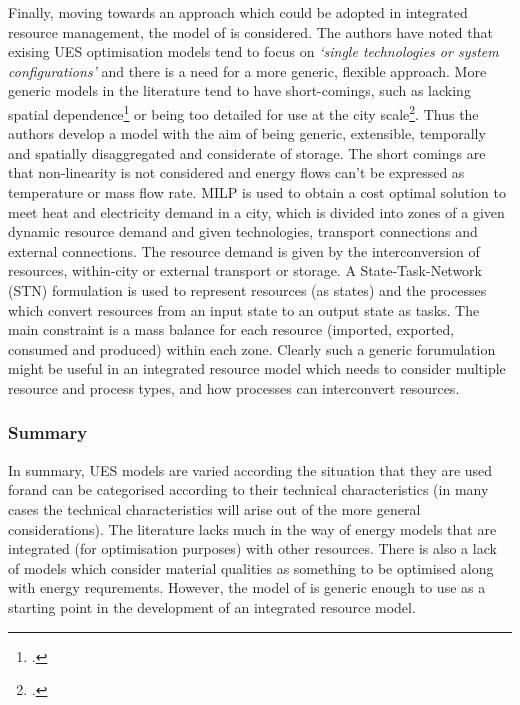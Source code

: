Finally, moving towards an approach which could be adopted in integrated resource management, the model of \citet{Samsatli} is considered. The authors have noted that exising UES optimisation models tend to focus on \emph{`single technologies or system configurations'} and there is a need for a more generic, flexible approach. More generic models in the literature tend to have short-comings, such as lacking spatial dependence\footnote{\citet{Ren2010}.} or being too detailed for use at the city scale\footnote{\citet{Weber2011}.}. Thus the authors develop a model with the aim of being generic, extensible, temporally and spatially disaggregated and considerate of storage. The short comings are that non-linearity is not considered and energy flows can't be expressed as temperature or mass flow rate. MILP is used to obtain a cost optimal solution to meet heat and electricity demand in a city, which is divided into zones of a given dynamic resource demand and given technologies, transport connections and external connections. The resource demand is given by the interconversion of resources, within-city or external transport or storage. A State-Task-Network (STN) formulation is used to represent resources (as states) and the processes which convert resources from an input state to an output state as tasks. The main constraint is a mass balance for each resource (imported, exported, consumed and produced) within each zone. Clearly such a generic forumulation might be useful in an integrated resource model which needs to consider multiple resource and process types, and how processes can interconvert resources.

\subsubsection*{Summary}
In summary, UES models are varied according the situation that they are used forand can be categorised according to their technical characteristics (in many cases the technical characteristics will arise out of the more general considerations). The literature lacks much in the way of energy models that are integrated (for optimisation purposes) with other resources. There is also a lack of models which consider material qualities as something to be optimised along with energy requrements. However, the model of \citep{Samasatli} is generic enough to use as a starting point in the development of an integrated resource model.

